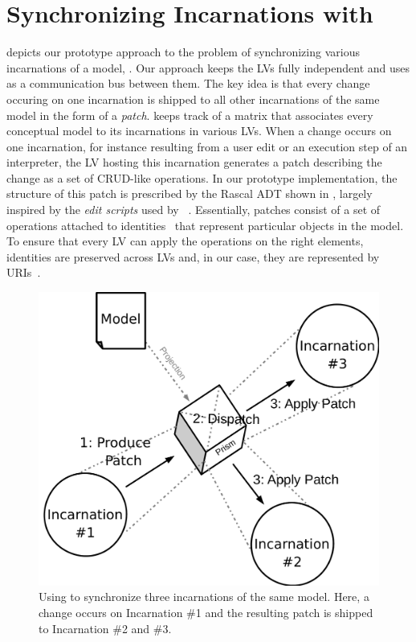 \section{Synchronizing Incarnations with \prism}
\label{sec:prism}

 depicts our prototype approach to the problem of synchronizing various incarnations of a model, \prism.
Our approach keeps the LVs fully independent and uses \prism as a communication bus between them.
The key idea is that every change occuring on one incarnation is shipped to all other incarnations of the same model in the form of a \emph{patch}.
\prism keeps track of a matrix that associates every conceptual model to its incarnations in various LVs.
When a change occurs on one incarnation, for instance resulting from a user edit or an execution step of an interpreter, the LV hosting this incarnation generates a patch describing the change as a set of CRUD-like operations.
In our prototype implementation, the structure of this patch is prescribed by the Rascal ADT shown in , largely inspired by the \emph{edit scripts} used by \citeauthor{rozen2017towards}~\cite{rozen2017towards}.
Essentially, patches consist of a set of operations attached to identities~\cite{klint2016model} that represent particular objects in the model.
To ensure that every LV can apply the operations on the right elements, identities are preserved across LVs and, in our case, they are represented by URIs~\cite{berners2004uniform}.


\begin{figure}[bt]
	\centering
	\includegraphics[width=.6\columnwidth]{figures/prism}
	\caption{Using \prism to synchronize three incarnations of the same model. Here, a change occurs on Incarnation \#1 and the resulting patch is shipped to Incarnation \#2 and \#3.}
	\label{fig:prism}
\end{figure}


